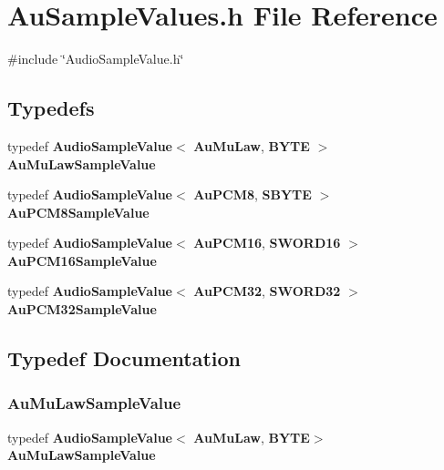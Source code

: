 \section{Au\+Sample\+Values.\+h File Reference}
\label{AuSampleValues_8h}
{\ttfamily \#include \char`\"{}Audio\+Sample\+Value.\+h\char`\"{}}\newline
\subsection*{Typedefs}
\begin{DoxyCompactItemize}
\item 
typedef \textbf{ Audio\+Sample\+Value}$<$ \textbf{ Au\+Mu\+Law}, \textbf{ B\+Y\+TE} $>$ \textbf{ Au\+Mu\+Law\+Sample\+Value}
\item 
typedef \textbf{ Audio\+Sample\+Value}$<$ \textbf{ Au\+P\+C\+M8}, \textbf{ S\+B\+Y\+TE} $>$ \textbf{ Au\+P\+C\+M8\+Sample\+Value}
\item 
typedef \textbf{ Audio\+Sample\+Value}$<$ \textbf{ Au\+P\+C\+M16}, \textbf{ S\+W\+O\+R\+D16} $>$ \textbf{ Au\+P\+C\+M16\+Sample\+Value}
\item 
typedef \textbf{ Audio\+Sample\+Value}$<$ \textbf{ Au\+P\+C\+M32}, \textbf{ S\+W\+O\+R\+D32} $>$ \textbf{ Au\+P\+C\+M32\+Sample\+Value}
\end{DoxyCompactItemize}


\subsection{Typedef Documentation}
\mbox{\label{AuSampleValues_8h_ae271bae6c1ac0100da7f42a82608d8b0}} 
\subsubsection{Au\+Mu\+Law\+Sample\+Value}
{\footnotesize\ttfamily typedef \textbf{ Audio\+Sample\+Value}$<$\textbf{ Au\+Mu\+Law},\textbf{ B\+Y\+TE}$>$ \textbf{ Au\+Mu\+Law\+Sample\+Value}}

\mbox{\label{AuSampleValues_8h_acb4277a3800f0d8437e1445b6d5a6723}} 
